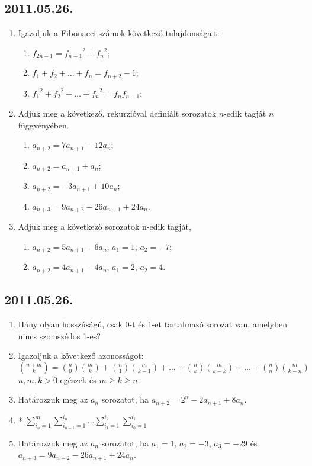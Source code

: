 \subsection*{2011.05.26.}
\begin{enumerate}
\item Igazoljuk a Fibonacci-számok következő tulajdonságait:
\begin{enumerate}
\item $f_{2n-1}={f_{n-1}}^2+{f_n}^2$;
\item $f_1+f_2+\ldots+f_n=f_{n+2}-1$;
\item ${f_1}^2+{f_2}^2+\ldots+{f_n}^2=f_nf_{n+1}$;
\end{enumerate}
\item Adjuk meg a következő, rekurzióval definiált sorozatok $n$-edik tagját $n$ függvényében.
\begin{enumerate}
\item $a_{n+2}=7a_{n+1}-12a_n$;
\item $a_{n+2}=a_{n+1}+a_n$;
\item $a_{n+2}=-3a_{n+1}+10a_n$;
\item $a_{n+3}=9a_{n+2}-26a_{n+1}+24a_n$.
\end{enumerate}
\item Adjuk meg a következő sorozatok n-edik tagját,
\begin{enumerate}
\item $a_{n+2}=5a_{n+1}-6a_n$, $a_1=1$, $a_2=-7$;
\item $a_{n+2}=4a_{n+1}-4a_n$, $a_1=2$, $a_2=4$.
\end{enumerate}
\end{enumerate}

\subsection*{2011.05.26.}
\begin{enumerate}
\item Hány olyan hosszúságú, csak 0-t és 1-et tartalmazó sorozat van, amelyben nincs szomszédos 1-es?
\item Igazoljuk a következő azonosságot:
$\binom {n+m}k=\binom n0\binom mk+\binom n1\binom m{k-1}+\ldots+\binom nk\binom m{k-k}+\ldots+\binom nn\binom m{k-n}$
$n, m, k > 0$ egészek és $m\ge k\ge n$.
\item Határozzuk meg az $a_n$ sorozatot, ha $a_{n+2}=2^n-2a_{n+1}+8a_n$.
\item* $\sum\limits_{i_n=1}^m \sum\limits_{i_{n-1}=1}^{i_n} \ldots \sum\limits_{i_1=1}^{i_2} \sum\limits_{i_0=1}^{i_1}$
\item Határozzuk meg az $a_n$ sorozatot, ha $a_1=1$, $a_2=-3$, $a_3=-29$ és $a_{n+3}=9a_{n+2}-26a_{n+1}+24a_n$.
\end{enumerate}

